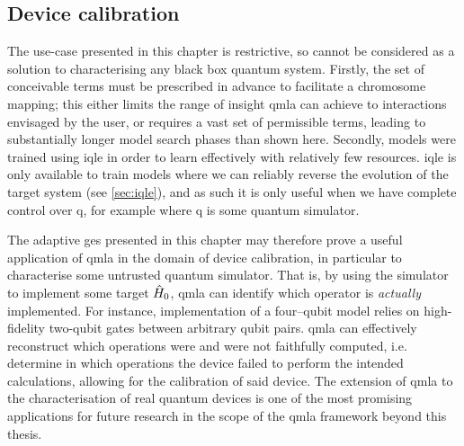 \subsection{Device calibration}
The use-case presented in this chapter is restrictive,
    so cannot be considered as a solution to characterising any black box quantum system.
Firstly, the set of conceivable terms must be prescribed in advance to facilitate a chromosome mapping;
    this either limits the range of insight \gls{qmla} can achieve to interactions envisaged by the user,
    or requires a vast set of permissible terms, leading to substantially longer model search phases than shown here. 
Secondly, models were trained using \gls{iqle} in order to learn effectively with relatively few resources. 
\gls{iqle} is only available to train models where we can reliably reverse the evolution of the target system 
    (see \cref{sec:iqle}), and as such it is only useful when we have complete control over \gls{q}, 
    for example where \gls{q} is some quantum simulator. 
\par 
The adaptive \gls{ges} presented in this chapter may therefore prove a useful 
    application of \gls{qmla} in the domain of device calibration,
    in particular to characterise some untrusted quantum simulator.
That is, by using the simulator to implement some target $\hat{H}_0$, 
    \gls{qmla} can identify which operator is \emph{actually} implemented.
For instance, implementation of a four--qubit model
    relies on high-fidelity two-qubit gates between arbitrary qubit pairs.
\gls{qmla} can effectively reconstruct which operations were and were not faithfully computed,
    i.e. determine in which operations the device failed to perform the intended calculations,
    allowing for the calibration of said device. 
The extension of \gls{qmla} to the characterisation of real quantum devices is one of the 
    most promising applications 
    for future research in the scope of the \gls{qmla} framework beyond this thesis.  